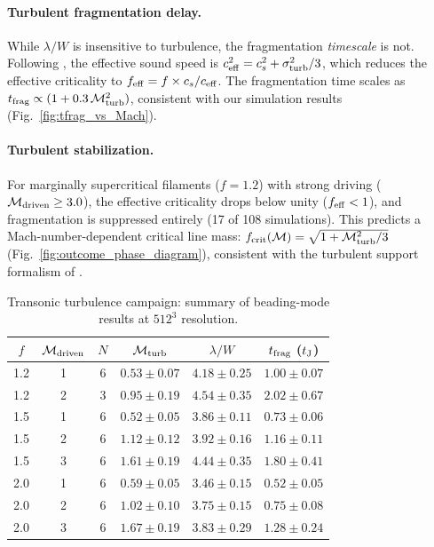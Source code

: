 \paragraph{Turbulent fragmentation delay.}
While $\lambda/W$ is insensitive to turbulence, the fragmentation \emph{timescale} is not.
Following \citet{Heitsch2009}, the effective sound speed is
$c_{\rm eff}^2 = c_s^2 + \sigma_{\rm turb}^2/3$, which reduces the effective criticality to
$f_{\rm eff} = f \times c_s/c_{\rm eff}$. The fragmentation time scales as
$t_{\rm frag} \propto (1 + 0.3\,\mathcal{M}_{\rm turb}^2)$, consistent with our simulation
results (Fig.~\ref{fig:tfrag_vs_Mach}).

\paragraph{Turbulent stabilization.}
For marginally supercritical filaments ($f = 1.2$) with strong driving
($\mathcal{M}_{\rm driven} \geq 3.0$), the effective criticality drops below unity
($f_{\rm eff} < 1$), and fragmentation is suppressed entirely (17 of 108 simulations).
This predicts a Mach-number-dependent critical line mass:
$f_{\rm crit}(\mathcal{M}) = \sqrt{1 + \mathcal{M}_{\rm turb}^2/3}$
(Fig.~\ref{fig:outcome_phase_diagram}), consistent with the turbulent support formalism
of \citet{Heitsch2009}.

\begin{table}
\caption{Transonic turbulence campaign: summary of beading-mode results at $512^3$ resolution.}
\label{tab:transonic_results}
\centering
\begin{tabular}{cccccc}
\hline
$f$ & $\mathcal{M}_{\rm driven}$ & $N$ & $\mathcal{M}_{\rm turb}$ & $\lambda/W$ & $t_{\rm frag}$ ($t_{\rm J}$) \\
\hline
1.2 & 1 & 6 & $0.53 \pm 0.07$ & $4.18 \pm 0.25$ & $1.00 \pm 0.07$ \\
1.2 & 2 & 3 & $0.95 \pm 0.19$ & $4.54 \pm 0.35$ & $2.02 \pm 0.67$ \\
1.5 & 1 & 6 & $0.52 \pm 0.05$ & $3.86 \pm 0.11$ & $0.73 \pm 0.06$ \\
1.5 & 2 & 6 & $1.12 \pm 0.12$ & $3.92 \pm 0.16$ & $1.16 \pm 0.11$ \\
1.5 & 3 & 6 & $1.61 \pm 0.19$ & $4.44 \pm 0.35$ & $1.80 \pm 0.41$ \\
2.0 & 1 & 6 & $0.59 \pm 0.05$ & $3.46 \pm 0.15$ & $0.52 \pm 0.05$ \\
2.0 & 2 & 6 & $1.02 \pm 0.10$ & $3.75 \pm 0.15$ & $0.75 \pm 0.08$ \\
2.0 & 3 & 6 & $1.67 \pm 0.19$ & $3.83 \pm 0.29$ & $1.28 \pm 0.24$ \\
\hline
\end{tabular}
\end{table}
